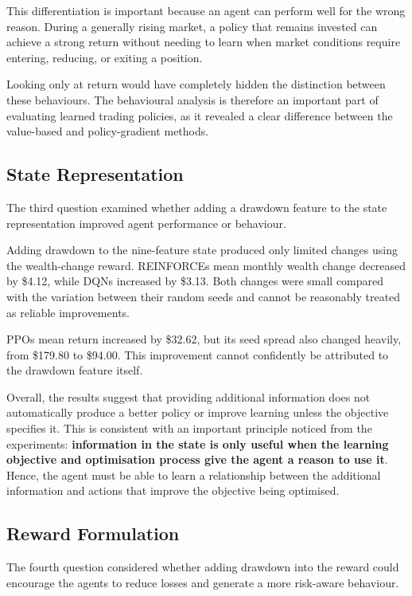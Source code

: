 This differentiation is important because an agent can perform well for
the wrong reason. During a generally rising market, a policy that
remains invested can achieve a strong return without needing to learn
when market conditions require entering, reducing, or exiting a
position.

Looking only at return would have completely hidden the distinction
between these behaviours. The behavioural analysis is therefore an
important part of evaluating learned trading policies, as it revealed a
clear difference between the value-based and policy-gradient methods.

\subsection{State Representation}

The third question examined whether adding a drawdown feature to the
state representation improved agent performance or behaviour.

Adding drawdown to the nine-feature state produced only limited changes
using the wealth-change reward. REINFORCE\textquotesingle s mean monthly
wealth change decreased by \$4.12, while DQN\textquotesingle s increased
by \$3.13. Both changes were small compared with the variation between
their random seeds and cannot be reasonably treated as reliable
improvements.

PPO\textquotesingle s mean return increased by \$32.62, but its seed
spread also changed heavily, from \$179.80 to \$94.00. This improvement
cannot confidently be attributed to the drawdown feature itself.

Overall, the results suggest that providing additional information does
not automatically produce a better policy or improve learning unless the
objective specifies it. This is consistent with an important principle
noticed from the experiments: \textbf{information in the state is only
useful when the learning objective and optimisation process give the
agent a reason to use it}. Hence, the agent must be able to learn a
relationship between the additional information and actions that improve
the objective being optimised.

\subsection{Reward Formulation}

The fourth question considered whether adding drawdown into the reward
could encourage the agents to reduce losses and generate a more
risk-aware behaviour.

